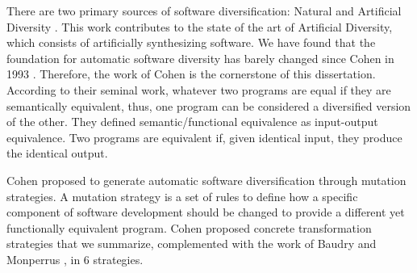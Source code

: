 There are two primary sources of software diversification: Natural and Artificial Diversity \cite{natural_diversity}. This work contributes to the state of the art of Artificial Diversity, which consists of artificially synthesizing software. 
We have found that the foundation for automatic software diversity has barely changed since Cohen in 1993 \cite{cohen1993operating}. Therefore, the work of Cohen is the cornerstone of this dissertation.
According to their seminal work, whatever two programs are equal if they are semantically equivalent, thus, one program can be considered a diversified version of the other. 
They defined semantic/functional equivalence as input-output equivalence. Two programs are equivalent if, given identical input, they produce the identical output. 

Cohen \etal proposed to generate automatic software diversification through mutation strategies.
A mutation strategy is a set of rules to define how a specific component of software development should be changed to provide a different yet functionally equivalent program. Cohen \etal proposed  concrete transformation strategies that we summarize, complemented with the work of Baudry and Monperrus \cite{natural_diversity}, in 6 strategies.






